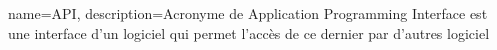 {
    name=API,
    description={Acronyme de Application Programming Interface est une interface 
    d'un logiciel qui permet l'accès de ce dernier par d'autres logiciel}
}